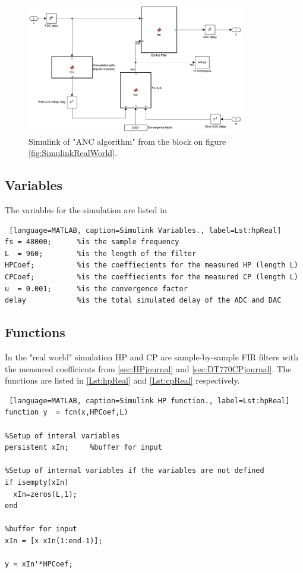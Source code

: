 \begin{figure}[H]
	\centering
	\includegraphics[width=0.85\textwidth]{figures/BasicSystem/SimulinkANC}
	\caption{Simulink of "ANC algorithm" from the block on figure \ref{fig:SimulinkRealWorld}.}
	\label{fig:SimulinkANC}
\end{figure} 

\subsection{Variables}
The variables for the simulation are listed in 
\begin{lstlisting} [language=MATLAB, caption=Simulink Variables., label=Lst:hpReal]
fs = 48000; 	 %is the sample frequency
L  = 960;  	 	 %is the length of the filter
HPCoef;  		 %is the coeffiecients for the measured HP (length L)
CPCoef;  		 %is the coeffiecients for the measured CP (length L)
u  = 0.001;		 %is the convergence factor
delay 			 %is the total simulated delay of the ADC and DAC 
\end{lstlisting}

\subsection{Functions}
In the "real world" simulation HP and CP are sample-by-sample FIR filters with the measured coefficients from \autoref{sec:HPjournal} and  \autoref{sec:DT770CPjournal}. The functions are listed in \autoref{Lst:hpReal} and  \autoref{Lst:cpReal} respectively. 

\begin{lstlisting} [language=MATLAB, caption=Simulink HP function., label=Lst:hpReal]
function y  = fcn(x,HPCoef,L)

%Setup of interal variables
persistent xIn;     %buffer for input

%Setup of internal variables if the variables are not defined
if isempty(xIn)
  xIn=zeros(L,1);
end

%buffer for input
xIn = [x xIn(1:end-1)];

y = xIn'*HPCoef;
\end{lstlisting}


